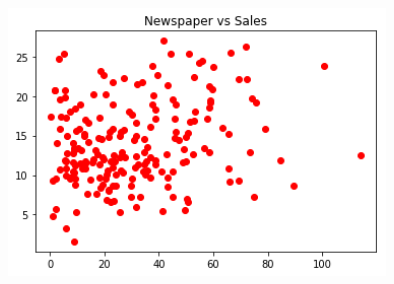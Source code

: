 \begin{center}
	\includegraphics[width=10cm,keepaspectratio=true]{./images/newsVsSales.png}
\end{center}

